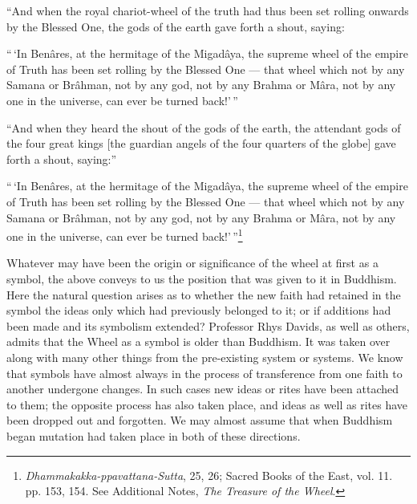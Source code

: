 \documentclass[a4paper, 11pt, oneside, polutonikogreek, english]{article}
\begin{document}
``And when the royal chariot-wheel of the truth had thus been set rolling onwards by the Blessed One, the gods of the earth gave forth a shout, saying:

``\,`In Benâres, at the hermitage of the Migadâya, the supreme wheel of the empire of Truth has been set rolling by the Blessed One --- that wheel which not by any Samana or Brâhman, not by any god, not by any Brahma or Mâra, not by any one in the universe, can ever be turned back!'\,''

``And when they heard the shout of the gods of the earth, the attendant gods of the four great kings [the guardian angels of the four quarters of the globe] gave forth a shout, saying:''

``\,`In Benâres, at the hermitage of the Migadâya, the supreme wheel of the empire of Truth has been set rolling by the Blessed One --- that wheel which not by any Samana or Brâhman, not by any god, not by any Brahma or Mâra, not by any one in the universe, can ever be turned back!'\,''\footnote{\emph{Dhammakakka-ppavattana-Sutta}, 25, 26; Sacred Books of the East, vol. 11. pp. 153, 154. See Additional Notes, \emph{The Treasure of the Wheel}.}

Whatever may have been the origin or significance of the wheel at first as a symbol, the above conveys to us the position that was given to it in Buddhism. Here the natural question arises as to whether the new faith had retained in the symbol the ideas only which had previously belonged to it; or if additions had been made and its symbolism extended? Professor Rhys Davids, as well as others, admits that the Wheel as a symbol is older than Buddhism. It was taken over along with many other things from the pre-existing system or systems. We know that symbols have almost always in the process of transference from one faith to another undergone changes. In such cases new ideas or rites have been attached to them; the opposite process has also taken place, and ideas as well as rites have been dropped out and forgotten. We may almost assume that when Buddhism began mutation had taken place in both of these directions.
\end{document}
